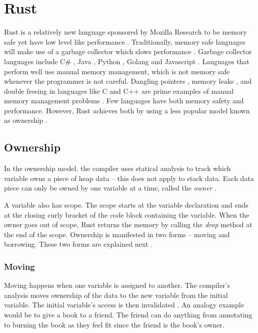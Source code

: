 \section{Rust}
\label{sec:rust}
\newcommand{\errorh}[1]{\textcolor{Red!60!Maroon}{\footnotesize{- #1}}}

Rust is a relatively new language sponsored by Mozilla Research to be memory safe yet have low level like performance \cite{klabnik_2019_01}.
Traditionally, memory safe languages will make use of a garbage collector which slows performance \cite{hertz_05_01}.
Garbage collector languages include C\# \cite{robinson_04_01}, Java \cite{gosling_96_01}, Python \cite{martelli_06_01}, Golang \cite{tsoukalos_18_01} and Javascript \cite{flanagan_06_01}.
Languages that perform well use manual memory management, which is not memory safe whenever the programmer is not careful.
Dangling pointers \cite{caballero_12_01}, memory leaks \cite{wilson_92_01}, and double freeing \cite{sharp_13_01} in languages like C and C++ are prime examples of manual memory management problems \cite{konrad_18_01}.
Few languages have both memory safety and performance.
However, Rust achieves both by using a less popular model known as ownership \cite{matsakis_14_01}.

\subsection{Ownership}
In the ownership model, the compiler uses statical analysis \cite{rasmussen_2019_01} to track which variable owns a piece of heap data -- this does not apply to stack data.
Each data piece can only be owned by one variable at a time, called the \textit{owner} \cite{klabnik_2019_01}.

A variable also has scope.
The scope starts at the variable declaration and ends at the closing curly bracket of the code block containing the variable.
When the owner goes out of scope, Rust returns the memory by calling the \textit{drop} method at the end of the scope.
Ownership is manifested in two forms -- moving and borrowing.
These two forms are explained next \cite{klabnik_2019_01}.

\subsubsection{Moving}
Moving happens when one variable is assigned to another.
The compiler's analysis moves ownership of the data to the new variable from the initial variable.
The initial variable's access is then invalidated \cite{klabnik_2019_01}.
An analogy example would be to give a book to a friend.
The friend can do anything from annotating to burning the book as they feel fit since the friend is the book's owner.

